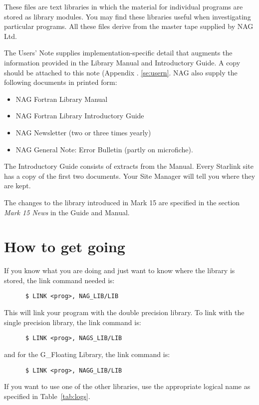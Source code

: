 These files are text libraries in which the material for individual programs
are stored as library modules. You may find these libraries useful when
investigating particular programs. All these files derive from the master tape
supplied by NAG Ltd.

The Users' Note supplies implementation-specific detail that augments the
information provided in the Library Manual and Introductory Guide. A copy
should be attached to this note (Appendix . \ref{se:usern}. NAG also supply the
following documents in printed form:

\begin{itemize}
\item NAG Fortran Library Manual
\item NAG Fortran Library Introductory Guide
\item NAG Newsletter (two or three times yearly)
\item NAG General Note: Error Bulletin (partly on microfiche).
\end{itemize}

The Introductory Guide consists of extracts from the Manual. Every Starlink
site has a copy of the first two documents. Your Site Manager will tell you
where they are kept.

The changes to the library introduced in Mark 15 are specified in the section
{\em Mark 15 News} in the Guide and Manual.

\section{How to get going}

If you know what you are doing and just want to know where the library is
stored, the link command needed is:
\begin{verbatim}
      $ LINK <prog>, NAG_LIB/LIB
\end{verbatim}
This will link your program with the double precision library. To link with the
single precision library, the link command is:
\begin{verbatim}
      $ LINK <prog>, NAGS_LIB/LIB
\end{verbatim}
and for the G\_Floating Library, the link command is:
\begin{verbatim}
      $ LINK <prog>, NAGG_LIB/LIB
\end{verbatim}

If you want to use one of the other libraries, use the appropriate logical
name as specified in Table~\ref{tab:logs}.

